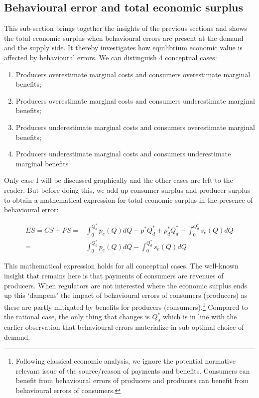 \documentclass[
]{book}
\providecommand{\tightlist}{%
  \setlength{\itemsep}{0pt}\setlength{\parskip}{0pt}}
\begin{document}
\hypertarget{totalsurplus}{%
\subsection{Behavioural error and total economic surplus}\label{totalsurplus}}

This sub-section brings together the insights of the previous sections and shows the total economic surplus when behavioural errors are present at the demand and the supply side. It thereby investigates how equilibrium economic value is affected by behavioural errors. We can distinguish 4 conceptual cases:

\begin{enumerate}
\def\labelenumi{\Roman{enumi}.}
\tightlist
\item
  Producers overestimate marginal costs and consumers overestimate marginal benefits;
\item
  Producers overestimate marginal costs and consumers underestimate marginal benefits;
\item
  Producers underestimate marginal costs and consumers overestimate marginal benefits;
\item
  Producers underestimate marginal costs and consumers underestimate marginal benefits
\end{enumerate}

Only case I will be discussed graphically and the other cases are left to the reader. But before doing this, we add up consumer surplus and producer surplus to obtain a mathematical expression for total economic surplus in the presence of behavioural error:

\begin{align}
ES = CS + PS =& \int_0^{Q_d^*} p_e(Q)dQ - p^*Q_d^* + p_d^* Q_d^* - \int_0^{Q_d^*} s_e(Q)dQ \\
=& \int_0^{Q_d^*} p_e(Q)dQ - \int_0^{Q_d^*} s_e(Q)dQ
\end{align}

This mathematical expression holds for all conceptual cases. The well-known insight that remains here is that payments of consumers are revenues of producers. When regulators are not interested where the economic surplus ends up this `dampens' the impact of behavioural errors of consumers (producers) as these are partly mitigated by benefits for producers (consumers).\footnote{Following classical economic analysis, we ignore the potential normative relevant issue of the source/reason of payments and benefits. Consumers can benefit from behavioural errors of producers and producers can benefit from behavioural errors of consumers.} Compared to the rational case, the only thing that changes is \(Q_d^*\) which is in line with the earlier observation that behavioural errors materialize in sub-optimal choice of demand.
\end{document}
